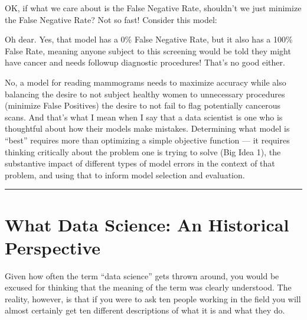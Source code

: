 \documentclass[letterpaper,10pt,english]{jupyterBook}
\begin{document}
\sphinxAtStartPar
OK, if what we care about is the False Negative Rate, shouldn’t we just minimize the False Negative Rate? Not so fast! Consider this model:

\begin{sphinxVerbatim}[commandchars=\\\{\}]
 
      
     
\end{sphinxVerbatim}

\sphinxAtStartPar
Oh dear. Yes, that model has a 0\% False Negative Rate, but it also has a 100\% False  Rate, meaning anyone subject to this screening would be told they might have cancer and needs followup diagnostic procedures! That’s no good either.

\sphinxAtStartPar
No, a  model for reading mammograms needs to maximize accuracy while also balancing the desire to not subject healthy women to unnecessary procedures (minimize False Positives)  the desire to not fail to flag potentially cancerous scans. And that’s what I mean when I say that a  data scientist is one who is thoughtful about how their models make mistakes. Determining what model is “best” requires more than optimizing a simple objective function — it requires thinking critically about the problem one is trying to solve (Big Idea 1), the substantive impact of different types of model errors in the context of that problem, and using that to inform model selection and evaluation.




\bigskip\hrule\bigskip


\sphinxstepscope


\chapter{What  Data Science: An Historical Perspective}
\label{\detokenize{10_introduction/40_data_science_in_historical_context:what-is-data-science-an-historical-perspective}}\label{\detokenize{10_introduction/40_data_science_in_historical_context::doc}}
\sphinxAtStartPar
Given how often the term “data science” gets thrown around, you would be excused for thinking that the meaning of the term was clearly understood. The reality, however, is that if you were to ask ten people working in the field you will almost certainly get ten different descriptions of what it is and what they do.
\end{document}
